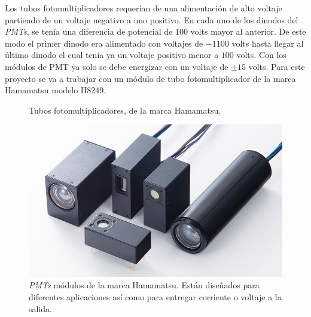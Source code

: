 Los tubos fotomultiplicadores requerían de una alimentación de alto voltaje partiendo de un voltaje negativo a uno positivo. En cada uno de los dinodos del \textit{PMTs}, se tenía una diferencia de potencial de 100 volts mayor al anterior. De este modo el primer dinodo era alimentado con voltajes de $-1100$ volts hasta llegar al último dinodo el cual tenía ya un voltaje positivo menor a $100$ volts.
Con los módulos de PMT ya solo se debe energizar con un voltaje de $\pm 15$ volts. Para este proyecto se va a trabajar con un módulo de tubo fotomultiplicador de la marca Hamamatsu modelo H8249.

\begin{figure}
	\centering
	\caption[Tubos fotomultiplicadores]{Tubos fotomultiplicadores, de la marca Hamamatsu. \cite{Hamamatsu2007}}
	\label{fig:PMT}
\end{figure}

\begin{figure}
	\centering
	\includegraphics[width=0.7\linewidth]{Imagenes/2/PMTmodule}
	\caption{\textit{PMTs} módulos de la marca Hamamatsu. Están diseñados para diferentes aplicaciones así como para entregar corriente o voltaje a la salida. \cite{Hamamatsu2007}}
	\label{fig:pmtModule}
\end{figure}



